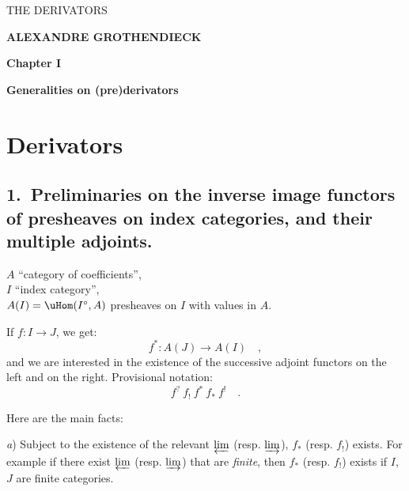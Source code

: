 \printedpage{--} %

\begin{center}
{\Large\textsf{THE DERIVATORS}}

\bigskip

\textbf{ALEXANDRE GROTHENDIECK}

\bigskip\bigskip

\textbf{Chapter I}

\medskip

\textbf{Generalities on (pre)derivators}
\end{center}

\clearpage

\printedpage{--} %


\clearpage



\section*{Derivators}

\subsection*{\textmd{1.}\ Preliminaries on the inverse image functors of presheaves on index categories, and their multiple adjoints.}

$A$ ``category of coefficients'',\\
$I$ ``index category'',\\
$A(I)=\uHom(I^{\circ},A)$ presheaves on $I$ with values in $A$.

If $f : I \to J$, we get:
\[
f^{*} : A(J) \to A(I) \quad ,
\]
and we are interested in the existence of the successive adjoint functors on the left and on the right. Provisional notation:
\[
f^{?}\ f_{!}\ f^{*}\ f_{*}\ f^{!} \quad .
\]

Here are the main facts:

\textit{a}) Subject to the existence of the relevant $\varprojlim$ (resp. $\varinjlim$), $f_{*}$ (resp. $f_{!}$) exists. For example if there exist $\varprojlim$ (resp. $\varinjlim$) that are \textit{finite}, then $f_{*}$ (resp. $f_{!}$) exists if $I$, $J$ are finite categories.

